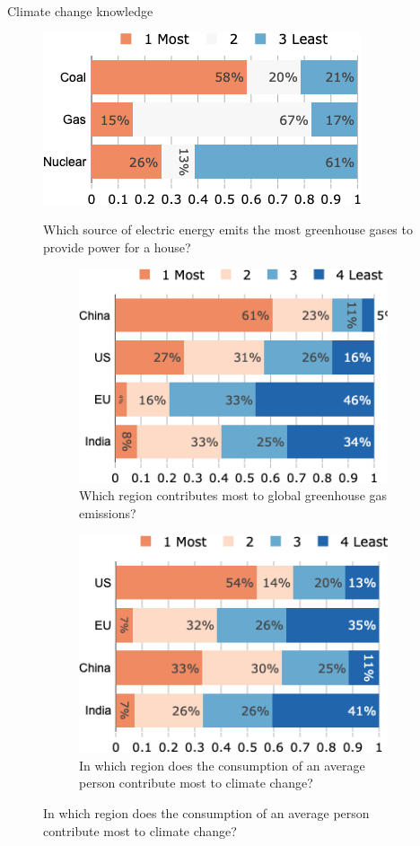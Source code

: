 \documentclass[aspectratio=169,9pt,dvipsnames]{beamer}
\begin{document}
\begin{frame}{Climate change knowledge}%
\begin{figure}[h!]
\centering
\caption{Which source of electric energy emits the most greenhouse gases to provide power for a house?}
\includegraphics[width=.3\textwidth]{../figures/US/footprint_elec_US.png} \\
\end{figure}
\begin{figure}[h!]
\centering
\begin{subfigure}[b]{0.49\textwidth}
\centering
\caption{Which region contributes most to global greenhouse gas emissions?} %
\includegraphics[width=.75\textwidth]{../figures/US/footprint_region_no_miss_US.png}
\end{subfigure}
\hfill
\begin{subfigure}[b]{0.49\textwidth}
\centering
\caption{In which region does the consumption of an average person contribute most to climate change?} %
\includegraphics[width=.75\textwidth]{../figures/US/footprint_pc_no_miss_US.png}
\end{subfigure}
\end{figure}
\end{frame}
\end{document}

